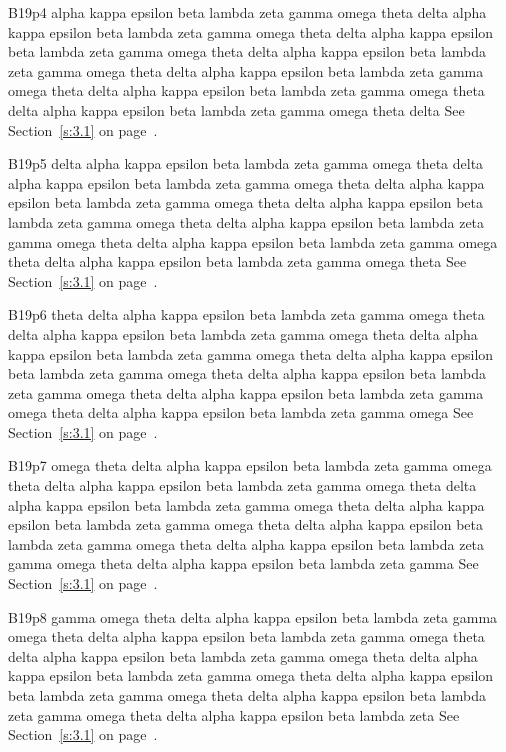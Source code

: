 B19p4 alpha kappa epsilon beta lambda zeta gamma omega theta delta alpha kappa epsilon beta lambda zeta gamma omega theta delta alpha kappa epsilon beta lambda zeta gamma omega theta delta alpha kappa epsilon beta lambda zeta gamma omega theta delta alpha kappa epsilon beta lambda zeta gamma omega theta delta alpha kappa epsilon beta lambda zeta gamma omega theta delta alpha kappa epsilon beta lambda zeta gamma omega theta delta See Section~\ref{s:3.1} on page~\pageref{s:3.1}.

B19p5 delta alpha kappa epsilon beta lambda zeta gamma omega theta delta alpha kappa epsilon beta lambda zeta gamma omega theta delta alpha kappa epsilon beta lambda zeta gamma omega theta delta alpha kappa epsilon beta lambda zeta gamma omega theta delta alpha kappa epsilon beta lambda zeta gamma omega theta delta alpha kappa epsilon beta lambda zeta gamma omega theta delta alpha kappa epsilon beta lambda zeta gamma omega theta See Section~\ref{s:3.1} on page~\pageref{s:3.1}.

B19p6 theta delta alpha kappa epsilon beta lambda zeta gamma omega theta delta alpha kappa epsilon beta lambda zeta gamma omega theta delta alpha kappa epsilon beta lambda zeta gamma omega theta delta alpha kappa epsilon beta lambda zeta gamma omega theta delta alpha kappa epsilon beta lambda zeta gamma omega theta delta alpha kappa epsilon beta lambda zeta gamma omega theta delta alpha kappa epsilon beta lambda zeta gamma omega See Section~\ref{s:3.1} on page~\pageref{s:3.1}.

B19p7 omega theta delta alpha kappa epsilon beta lambda zeta gamma omega theta delta alpha kappa epsilon beta lambda zeta gamma omega theta delta alpha kappa epsilon beta lambda zeta gamma omega theta delta alpha kappa epsilon beta lambda zeta gamma omega theta delta alpha kappa epsilon beta lambda zeta gamma omega theta delta alpha kappa epsilon beta lambda zeta gamma omega theta delta alpha kappa epsilon beta lambda zeta gamma See Section~\ref{s:3.1} on page~\pageref{s:3.1}.

B19p8 gamma omega theta delta alpha kappa epsilon beta lambda zeta gamma omega theta delta alpha kappa epsilon beta lambda zeta gamma omega theta delta alpha kappa epsilon beta lambda zeta gamma omega theta delta alpha kappa epsilon beta lambda zeta gamma omega theta delta alpha kappa epsilon beta lambda zeta gamma omega theta delta alpha kappa epsilon beta lambda zeta gamma omega theta delta alpha kappa epsilon beta lambda zeta See Section~\ref{s:3.1} on page~\pageref{s:3.1}.

